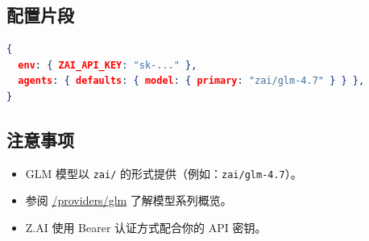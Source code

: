 \subsection{配置片段}


\begin{lstlisting}[language=json]
{
  env: { ZAI_API_KEY: "sk-..." },
  agents: { defaults: { model: { primary: "zai/glm-4.7" } } },
}
\end{lstlisting}


\subsection{注意事项}


\begin{itemize}
  \item GLM 模型以 \texttt{zai/} 的形式提供（例如：\texttt{zai/glm-4.7}）。
  \item 参阅 \href{/providers/glm}{/providers/glm} 了解模型系列概览。
  \item Z.AI 使用 Bearer 认证方式配合你的 API 密钥。
\end{itemize}



\clearpage
